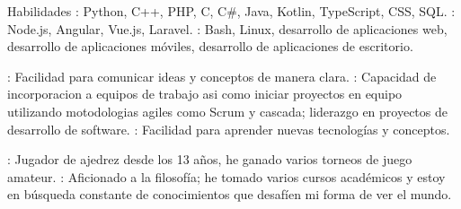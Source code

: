 
\begin{rubric}{Habilidades}
	: Python, C++, PHP, C, C\#, Java, Kotlin, TypeScript, CSS, SQL.
	\entry*[Frameworks]: Node.js, Angular, Vue.js, Laravel.
	: Bash, Linux, desarrollo de aplicaciones web, desarrollo de aplicaciones móviles, desarrollo de aplicaciones de escritorio.

	: Facilidad para comunicar ideas y conceptos de manera clara.
	: Capacidad de incorporacion a equipos de trabajo asi como iniciar proyectos en equipo utilizando motodologias agiles como Scrum y cascada; liderazgo en proyectos de desarrollo de software.
	: Facilidad para aprender nuevas tecnologías y conceptos.

	\entry*[Ajedrez]: Jugador de ajedrez desde los 13 años, he ganado varios torneos de juego amateur.
	\entry*[Filosofía]: Aficionado a la filosofía; he tomado varios cursos académicos y estoy en búsqueda constante de conocimientos que desafíen mi forma de ver el mundo.
\end{rubric}


